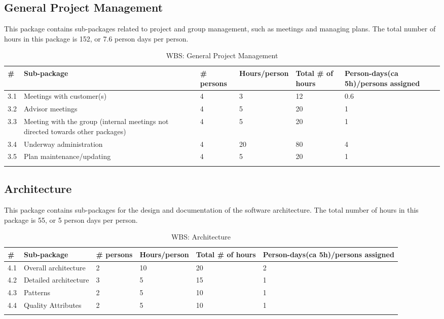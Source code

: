 \subsection{General Project Management}
This package contains sub-packages related to project and group management, such as meetings and managing plans. The total number of hours in this package is 152, or 7.6 person days per person.
\begin{longtable}{|p{0.7cm}|p{3cm}|p{1.8cm}|p{2.5cm}|p{2cm}|p{2.8cm}|}
\hline
\# & Sub-package & \# persons & Hours/person & Total \# of hours & Person-days(ca 5h)/persons assigned\\ 
\hline
3.1 & Meetings with customer(s)  & 4 & 3 & 12 & 0.6\\ 
\hline
3.2 & Advisor meetings  & 4 & 5 & 20 & 1\\ 
\hline
3.3 & Meeting with the group (internal meetings not directed towards other packages) & 4 & 5 & 20 & 1\\ 
\hline
3.4 & Underway administration & 4 & 20 & 80 & 4\\ 
\hline
3.5 & Plan maintenance/updating & 4 & 5 & 20 & 1\\ 
\hline

\caption{WBS: General Project Management}
\end{longtable}

\subsection{Architecture}
This package contains sub-packages for the design and documentation of the software architecture. The total number of hours in this package is 55, or 5 person days per person.
\begin{longtable}{|p{0.7cm}|p{3cm}|p{1.8cm}|p{2.5cm}|p{2cm}|p{2.8cm}|}
\hline
\# & Sub-package & \# persons & Hours/person & Total \# of hours & Person-days(ca 5h)/persons assigned\\ 
\hline
4.1 & Overall architecture & 2 & 10 & 20 & 2\\ 
\hline
4.2 & Detailed architecture & 3 & 5 & 15 & 1\\ 
\hline
4.3 & Patterns & 2 & 5 & 10 & 1\\ 
\hline
4.4 & Quality Attributes & 2 & 5 & 10 & 1\\ 
\hline
\caption{WBS: Architecture}
\end{longtable}

